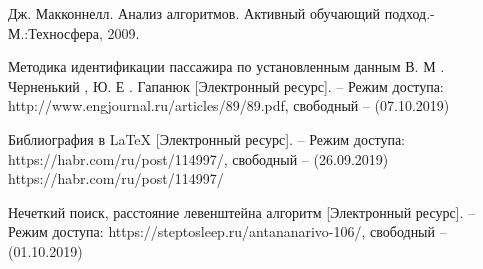 \documentclass[a4paper, 14pt]{article}
\begin{document}
	
	
	\newpage
	
	\begin{thebibliography}{4}
		Дж. Макконнелл. Анализ алгоритмов. Активный обучающий подход.-
		М.:Техносфера, 2009.
		
		
		Методика идентификации пассажира по установленным данным В. М . Черненький , Ю. Е . Гапанюк [Электронный ресурс]. – Режим доступа: http://www.engjournal.ru/articles/89/89.pdf, свободный – (07.10.2019)
		
		Библиография в LaTeX [Электронный ресурс]. – Режим доступа: https://habr.com/ru/post/114997/, свободный – (26.09.2019)
		https://habr.com/ru/post/114997/
		
		Нечеткий поиск, расстояние левенштейна алгоритм [Электронный ресурс]. – Режим доступа: https://steptosleep.ru/antananarivo-106/, свободный – (01.10.2019)
		
		\bibitem[]{}
		
	\end{thebibliography}

	
	
\end{document}
